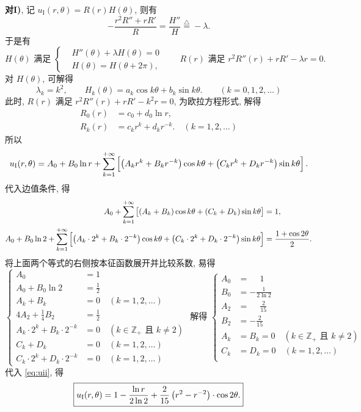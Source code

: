\begin{solution}
\textbf{对I)}, 记 $u_{\textrm{I}}(r,\theta) = R(r)H(\theta)$, 则有
\[
	-\frac{r^2 R'' + r R'}{R} = \frac{H''}{H} \overset{\triangle}{=} -\lambda.
\]
于是有
\[
	\text{$H(\theta)$ 满足\ }\left\{\begin{aligned}
		& H''(\theta) + \lambda H(\theta) = 0 \\
		& H(\theta) = H(\theta + 2\pi),
	\end{aligned}\right.
	\qquad
	\text{$R(r)$ 满足\ } r^2 R''(r) + r R' - \lambda r = 0.
\]
对 $H(\theta)$, 可解得
\[
	\lambda_k = k^2,\qquad
	H_k(\theta) = a_k \cos k\theta + b_k \sin k\theta. \qquad
	(k = 0,1,2,\dotsc)
\]
此时, $R(r)$ 满足 $r^2 R''(r) + r R' - k^2 r = 0$, 为欧拉方程形式, 解得
\begin{align*}
	R_0(r) &= c_0 + d_0 \ln r, \\
	R_k(r) &= c_k r^k + d_k r^{-k}. \quad (k = 1,2,\dotsc)
\end{align*}
所以
\begin{equation}\label{eq:uii}
	u_{\textrm{I}}(r,\theta) = A_0 + B_0 \ln r
	+ \sum_{k = 1}^{+\infty} \sbr[2]{\del[1]{A_k r^k + B_k r^{-k}}\cos k\theta + \del[1]{C_k r^k + D_k r^{-k}}\sin k\theta}.
\end{equation}
代入边值条件, 得
\begin{align*}
	A_0 + \sum_{k = 1}^{+\infty} \sbr[1]{\del[0]{A_k + B_k}\cos k\theta + \del[0]{C_k + D_k}\sin k\theta} &= 1, \\
	A_0 + B_0 \ln 2 + \sum_{k = 1}^{+\infty} \sbr[2]{\del[1]{A_k \cdot 2^k + B_k \cdot 2^{-k}}\cos k\theta + \del[1]{C_k \cdot 2^k + D_k \cdot 2^{-k}}\sin k\theta} &= \frac{1 + \cos 2\theta}{2}.	
\end{align*}
将上面两个等式的右侧按本征函数展开并比较系数, 易得
\[
	\left\{\begin{aligned}
	A_0 &= 1 \\
	A_0 + B_0 \ln 2 &= \frac 12 \\
	A_k + B_k &= 0 \quad (k=1,2,\dotsc) \\
	4 A_2 + \frac 14 B_2 &= \frac 12\\
	A_k \cdot 2^k + B_k \cdot 2^{-k} &= 0 \quad (k \in \mathbb{Z}_+ \text{ 且\ } k \neq 2) \\
	C_k + D_k &= 0 \quad (k=1,2,\dotsc) \\
	C_k \cdot 2^k + D_k \cdot 2^{-k} &= 0 \quad (k=1,2,\dotsc)
	\end{aligned}\right.
	\text{ 解得\ }
	\left\{\begin{aligned}
	A_0 &= \phantom{-} 1 \\
	B_0 &=           - \frac{1}{2 \ln 2} \\
	A_2 &= \phantom{-} \frac{2}{15} \\
	B_2 &=           - \frac{2}{15} \\
	A_k &= B_k = 0 \quad (k \in \mathbb{Z}_+ \text{ 且\ } k \neq 2) \\
	C_k &= D_k = 0 \quad (k=1,2,\dotsc) \\
	\end{aligned}\right.
\]
代入 \eqref{eq:uii}, 得
\begin{equation}
	\boxed{u_{\textrm{I}}(r,\theta) = 1 - \frac{\ln r}{2 \ln 2} + \frac{2}{15} \del[1]{r^2 - r^{-2}} \cdot \cos 2\theta.}
\end{equation}



\end{solution}
